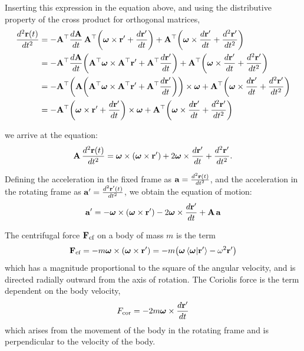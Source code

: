 \documentclass[12pt]{article}
\begin{document}
Inserting this expression in the equation above, and using the distributive property of the
cross product for orthogonal matrices,
\begin{equation}
  \begin{aligned}
    \frac{d^2\vb{r}(t)}{dt^2}
    &= -\vb{A}^\top\frac{d\vb{A}}{dt}\,\vb{A}^\top
       \!\left(\boldsymbol{\omega}\times\vb{r}' + \frac{d\vb{r}'}{dt}\right)
       + \vb{A}^\top\!\left(\boldsymbol{\omega}\times\frac{d\vb{r}'}{dt} + \frac{d^2\vb{r}'}{dt^2}\right) \\
    &= -\vb{A}^\top\frac{d\vb{A}}{dt}
       \!\left(\vb{A}^\top\boldsymbol{\omega}\times\vb{A}^\top\vb{r}'
         + \vb{A}^\top\frac{d\vb{r}'}{dt}\right)
       + \vb{A}^\top\!\left(\boldsymbol{\omega}\times\frac{d\vb{r}'}{dt} + \frac{d^2\vb{r}'}{dt^2}\right) \\
    &= -\vb{A}^\top\!\left(\vb{A}\!\left(\vb{A}^\top\boldsymbol{\omega}\times\vb{A}^\top\vb{r}'
         + \vb{A}^\top\frac{d\vb{r}'}{dt}\right)\right)\times\boldsymbol{\omega}
       + \vb{A}^\top\!\left(\boldsymbol{\omega}\times\frac{d\vb{r}'}{dt} + \frac{d^2\vb{r}'}{dt^2}\right) \\
    &= -\vb{A}^\top\!\left(\boldsymbol{\omega}\times\vb{r}' + \frac{d\vb{r}'}{dt}\right)\times\boldsymbol{\omega}
       + \vb{A}^\top\!\left(\boldsymbol{\omega}\times\frac{d\vb{r}'}{dt} + \frac{d^2\vb{r}'}{dt^2}\right)
  \end{aligned}
\end{equation}

we arrive at the equation:
\begin{equation}
  \vb{A}\,\frac{d^2\vb{r}(t)}{dt^2} =
    \boldsymbol{\omega}\times(\boldsymbol{\omega}\times\vb{r}')
    + 2\boldsymbol{\omega}\times\frac{d\vb{r}'}{dt}
    + \frac{d^2\vb{r}'}{dt^2}.
\end{equation}

Defining the acceleration in the fixed frame as $\vb{a} = \frac{d^2\vb{r}(t)}{dt^2}$, and
the acceleration in the rotating frame as $\vb{a}' = \frac{d^2\vb{r}'(t)}{dt^2}$, we obtain
the equation of motion:
\begin{equation}
  \vb{a}' = -\boldsymbol{\omega}\times(\boldsymbol{\omega}\times\vb{r}')
    - 2\boldsymbol{\omega}\times\frac{d\vb{r}'}{dt}
    + \vb{A}\,\vb{a}
  \label{eq:eom_rotating}
\end{equation}

The centrifugal force $\vb{F}_\text{cf}$ on a body of mass $m$ is the term
\begin{equation}
  \vb{F}_\text{cf} = -m\boldsymbol{\omega}\times(\boldsymbol{\omega}\times\vb{r}')
    = -m\bigl(\boldsymbol{\omega}\ip{\boldsymbol{\omega}}{\vb{r}'} - \omega^2\vb{r}'\bigr)
  \label{eq:centrifugal}
\end{equation}
which has a magnitude proportional to the square of the angular velocity, and is directed
radially outward from the axis of rotation. The Coriolis force is the term dependent on the
body velocity,
\begin{equation}
  F_\text{cor} = -2m\boldsymbol{\omega}\times\frac{d\vb{r}'}{dt}
  \label{eq:coriolis}
\end{equation}
which arises from the movement of the body in the rotating frame and is perpendicular to the
velocity of the body.
\end{document}
